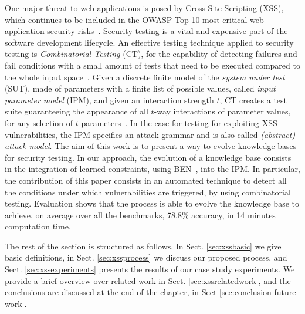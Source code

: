 \begin{tikzborder}{\cite{Gargantini16:validation}}
\begin{tikzborder}{\cite{gargantini_combinatorial_2017}}
One major threat to web applications is posed by Cross-Site Scripting (XSS), which continues to be included in the OWASP Top 10 most critical web application security risks~\cite{owasp17}.
Security testing is a vital and expensive part of the software development lifecycle.
An effective testing technique applied to security testing is \emph{Combinatorial Testing} (CT), for the capability of detecting failures and fail conditions with a small amount of tests that need to be executed compared to the whole input space~\cite{SKVKS2016:IEEEComp}. Given a discrete finite model of the \textit{system under test}
(SUT), made of parameters with a finite list of possible values, called \textit{input parameter model} (IPM), and given an
interaction strength $t$, CT creates a test suite guaranteeing the appearance of all $t$-way interactions of parameter values, for any selection of $t$ parameters~\cite{kuhn2013introductionbook}. 
In the case for testing for exploiting XSS vulnerabilities, the IPM specifies an attack grammar and is also called \textit{(abstract) attack model}.
The aim of this work is to present a way to evolve knowledge bases for security testing. 
In our approach, the evolution of a knowledge base consists in the integration of learned constraints, using BEN~\cite{ghandehari2018combinatorial}, into the IPM. 
In particular, the contribution of this paper consists in an automated technique to detect all the conditions under which vulnerabilities are triggered, by using combinatorial testing.
Evaluation shows that the process is able to evolve the knowledge base to achieve, on average over all the benchmarks, 78.8\% accuracy, in 14 minutes computation time.

The rest of the section is structured as follows. In Sect. \ref{sec:xssbasic} we give basic definitions,
in Sect. \ref{sec:xssprocess} we discuss our proposed process, and Sect. \ref{sec:xssexperiments} presents the results of our case study experiments. We provide a brief overview over related work in Sect. \ref{sec:xssrelatedwork},
and the conclusions are discussed at the end of the chapter, in Sect \ref{sec:conclusion-future-work}.


\end{tikzborder}
\end{tikzborder}
